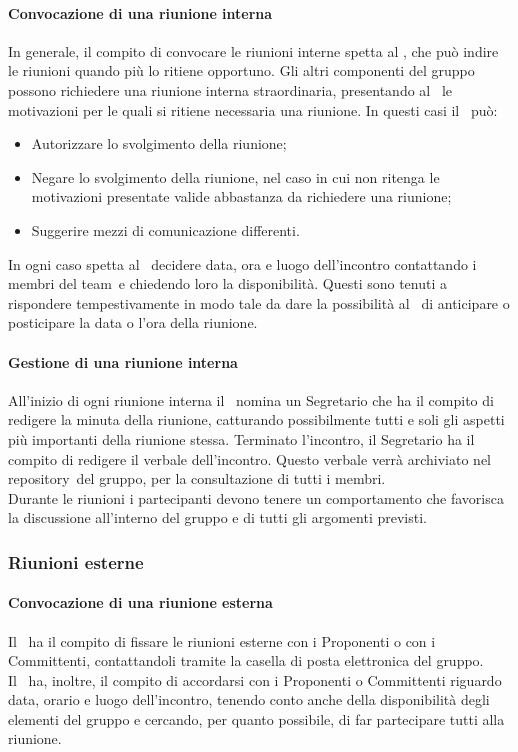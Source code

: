 \documentclass[../NormeProgetto.tex]{subfiles}
\begin{document}
			\paragraph{Convocazione di una riunione interna}
				In generale, il compito di convocare le riunioni interne spetta al \responsabilediprogetto, che può indire le riunioni quando più lo ritiene opportuno. Gli altri componenti del gruppo possono richiedere una riunione interna straordinaria, presentando al \responsabilediprogetto\ le motivazioni per le quali si ritiene necessaria una riunione. In questi casi il \responsabilediprogetto\ può:
				\begin{itemize}
					\item Autorizzare lo svolgimento della riunione;
					\item Negare lo svolgimento della riunione, nel caso in cui non ritenga le motivazioni presentate valide abbastanza da richiedere una riunione;
					\item Suggerire mezzi di comunicazione differenti.
				\end{itemize}
				In ogni caso spetta al \responsabilediprogetto\ decidere data, ora e luogo dell'incontro contattando i membri del team\g\ e chiedendo loro la disponibilità. Questi sono tenuti a rispondere tempestivamente in modo tale da dare la possibilità al \responsabilediprogetto\ di anticipare o posticipare la data o l'ora della riunione.
			\paragraph{Gestione di una riunione interna}
				All'inizio di ogni riunione interna il \responsabilediprogetto\ nomina un Segretario che ha il compito di redigere la minuta della riunione, catturando possibilmente tutti e soli gli aspetti più importanti della riunione stessa. Terminato l'incontro, il Segretario ha il compito di redigere il verbale dell'incontro. Questo verbale verrà archiviato nel repository\g\ del gruppo, per la consultazione di tutti i membri. \\ Durante le riunioni i partecipanti devono tenere un comportamento che favorisca la discussione all'interno del gruppo e di tutti gli argomenti previsti. 
		\subsubsection{Riunioni esterne}
				\paragraph{Convocazione di una riunione esterna}
					Il \responsabilediprogetto\ ha il compito di fissare le riunioni esterne con i Proponenti o con i Committenti, contattandoli tramite la casella di posta elettronica del gruppo.\\ Il \responsabilediprogetto\ ha, inoltre, il compito di accordarsi con i Proponenti o Committenti riguardo data, orario e luogo dell'incontro, tenendo conto anche della disponibilità degli elementi del gruppo e cercando, per quanto possibile, di far partecipare tutti alla riunione.
\end{document}
